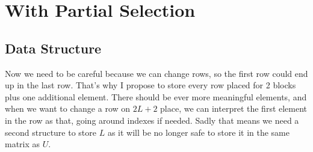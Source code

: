 \documentclass{article}
\begin{document}
\section*{With Partial Selection}
\subsection*{Data Structure}
Now we need to be careful because we can change rows, so the first row could end up in the last row. That's why I propose to store every row placed for 2 blocks plus one additional element. There should be ever more meaningful elements, and when we want to change a row on $2L + 2$ place, we can interpret the first element in the row as that, going around indexes if needed. Sadly that means we need a second structure to store $L$ as it will be no longer safe to store it in the same matrix as $U$.
\end{document}
